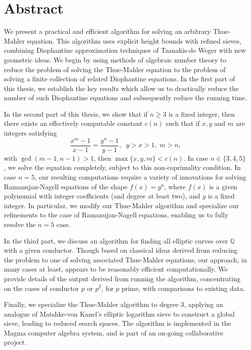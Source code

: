 
\chapter{Abstract}

We present a practical and efficient algorithm for solving an arbitrary Thue-Mahler equation. This algorithm uses explicit height bounds with refined sieves, combining Diophantine approximation techniques of Tzanakis-de Weger with new geometric ideas. We begin by using methods of algebraic number theory to reduce the problem of solving the Thue-Mahler equation to the problem of solving a finite collection of related Diophantine equations. In the first part of this thesis, we establish the key results which allow us to drastically reduce the number of such Diophantine equations and subsequently reduce the running time. 

In the second part of this thesis, we show that if $n \geq 3$ is a fixed integer, then there exists an effectively computable constant $c (n)$ such that if $x, y$ and $m$ are integers satisfying
$$
\frac{x^m-1}{x-1} = \frac{y^n-1}{y-1}, \; \; y>x>1, \; m > n,
$$
with $\gcd(m-1,n-1)>1$,
then $\max \{ x, y, m \} < c (n)$. In case $n \in \{ 3, 4, 5 \}$, we solve the equation completely, subject to this non-coprimality condition.  In case $n=5$, our resulting computations require a variety of innovations for solving Ramanujan-Nagell equations of the shape $f(x)=y^n$, where $f(x)$ is a given polynomial with integer coefficients (and degree at least two), and $y$ is a fixed integer. In particular, we modify our Thue-Mahler algorithm and specialize our refinements to the case of Ramanujan-Nagell equations, enabling us to fully resolve the $n = 5$ case. 

In the third part, we discuss an algorithm for finding all elliptic curves over $\mathbb{Q}$ with a given conductor. Though based on 
classical ideas derived from reducing the problem to one of solving associated Thue-Mahler equations,  our approach, in many cases at least, appears to be reasonably efficient  computationally. We provide 
details of the output derived from running the algorithm, concentrating on the cases of conductor $p$ or $p^2$, for $p$ prime, with comparisons to existing 
data. 

Finally, we specialize the Thue-Mahler algorithm to degree $3$, applying an analogue of Matshke-von K\:anel's elliptic logarithm sieve to construct a global sieve, leading to reduced search spaces. The algorithm is implemented in the Magma computer algebra system, and is part of an on-going collaborative project. 



